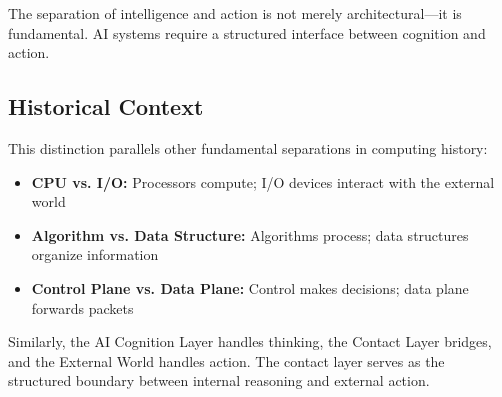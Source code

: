 The separation of intelligence and action is not merely architectural---it is fundamental. AI systems require a structured interface between cognition and action.

\subsection{Historical Context}
This distinction parallels other fundamental separations in computing history:
\begin{itemize}[leftmargin=*]
\item \textbf{CPU vs. I/O:} Processors compute; I/O devices interact with the external world
\item \textbf{Algorithm vs. Data Structure:} Algorithms process; data structures organize information
\item \textbf{Control Plane vs. Data Plane:} Control makes decisions; data plane forwards packets
\end{itemize}

Similarly, the AI Cognition Layer handles thinking, the Contact Layer bridges, and the External World handles action. The contact layer serves as the structured boundary between internal reasoning and external action.
